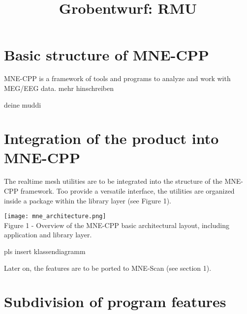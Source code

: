 \documentclass[a4paper, 11pt, english, fleqn]{article}
\begin{document}
	
\title{Grobentwurf: RMU}
\vspace{3 in}
\maketitle
\clearpage

\tableofcontents

\clearpage
\section{Basic structure of MNE-CPP}

MNE-CPP is a framework of tools and programs to analyze and work with MEG/EEG data.
mehr hinschreiben 

\begin{description}
	\item[deine muddi]

\end{description}

\clearpage

\section{Integration of the product into MNE-CPP}

The realtime mesh utilities are to be integrated into the structure of the MNE-CPP framework. Too provide a versatile interface, the utilities are organized inside a package within the library layer (see Figure 1).

\begin{center}
	\texttt{[image: mne\_architecture.png]}
	\\
	{Figure 1 - Overview of the MNE-CPP basic architectural layout, including application and library layer.}
\end{center}

{pls insert klassendiagramm}

Later on, the features are to be ported to MNE-Scan (see section 1).

\section{Subdivision of program features}
\end{document}

